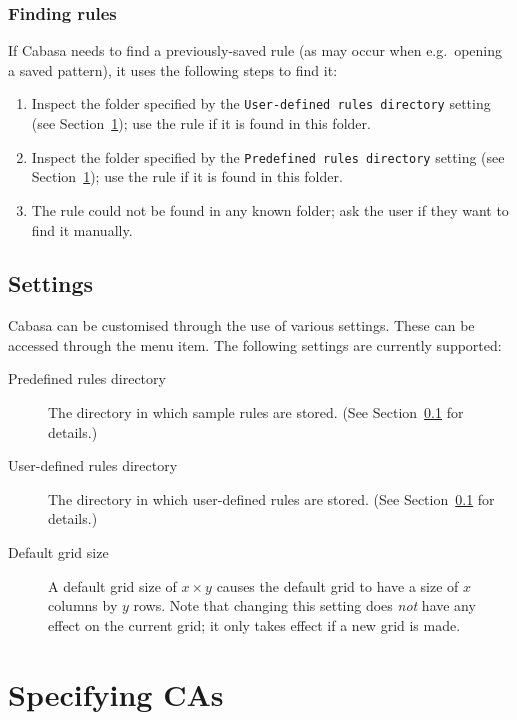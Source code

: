 \documentclass[oneside,a4paper]{memoir}
\begin{document}
\subsection{Finding rules}
\label{sec:findrs}

If Cabasa needs to find a previously-saved rule (as may occur when e.g.\ opening a saved pattern),
  it uses the following steps to find it:

\begin{enumerate}
\item Inspect the folder specified by the \texttt{User-defined rules directory} setting (see Section~\ref{sec:sets});
  use the rule if it is found in this folder.
\item Inspect the folder specified by the \texttt{Predefined rules directory} setting (see Section~\ref{sec:sets});
  use the rule if it is found in this folder.
\item The rule could not be found in any known folder; ask the user if they want to find it manually.
\end{enumerate}

\section{Settings}
\label{sec:sets}

Cabasa can be customised through the use of various settings.
These can be accessed through the  menu item.
The following settings are currently supported:

\begin{description}
\item[Predefined rules directory]
  The directory in which sample rules are stored.
  (See Section~\ref{sec:findrs} for details.)
\item[User-defined rules directory]
  The directory in which user-defined rules are stored.
  (See Section~\ref{sec:findrs} for details.)
\item[Default grid size]
  A default grid size of $x \times y$ causes the default grid to have a size of $x$ columns by $y$ rows.
  Note that changing this setting does \textit{not} have any effect on the current grid;
    it only takes effect if a new grid is made.
\end{description}

\chapter{Specifying CAs}
\label{chap:speccas}
\end{document}
